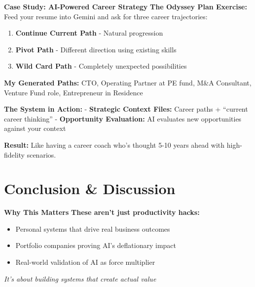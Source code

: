 \documentclass[
  ignorenonframetext,
  aspectratio=169,
]{beamer}
\providecommand{\tightlist}{%
  \setlength{\itemsep}{0pt}\setlength{\parskip}{0pt}}
\begin{document}
\begin{frame}{\textbf{Case Study: AI-Powered Career Strategy}}
\label{case-study-ai-powered-career-strategy}
\textbf{The Odyssey Plan Exercise:} Feed your resume into Gemini and ask
for three career trajectories:

\begin{enumerate}
\tightlist
\item
  \textbf{Continue Current Path} - Natural progression
\item
  \textbf{Pivot Path} - Different direction using existing skills\\
\item
  \textbf{Wild Card Path} - Completely unexpected possibilities
\end{enumerate}

\textbf{My Generated Paths:} CTO, Operating Partner at PE fund, M\&A
Consultant, Venture Fund role, Entrepreneur in Residence

\textbf{The System in Action:} - \textbf{Strategic Context Files:}
Career paths + ``current career thinking'' - \textbf{Opportunity
Evaluation:} AI evaluates new opportunities against your context

\textbf{Result:} Like having a career coach who's thought 5-10 years
ahead with high-fidelity scenarios.
\end{frame}

\begin{frame}
\end{frame}

\section{\texorpdfstring{\textbf{Conclusion \&
Discussion}}{Conclusion \& Discussion}}\label{conclusion-discussion}

\begin{frame}{\textbf{Why This Matters}}
\label{why-this-matters}
\textbf{These aren't just productivity hacks:}

\begin{itemize}
\tightlist
\item
  Personal systems that drive real business outcomes
\item
  Portfolio companies proving AI's deflationary impact\\
\item
  Real-world validation of AI as force multiplier
\end{itemize}

\emph{It's about building systems that create actual value}
\end{frame}
\end{document}
